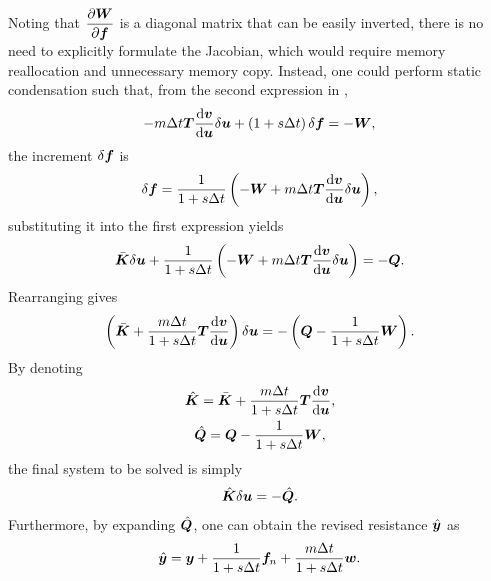Noting that $\dfrac{\partial{\bm{W}}}{\partial{\bm{f}}}$ is a diagonal matrix that can be easily inverted, there is no need to explicitly formulate the Jacobian, which would require memory reallocation and unnecessary memory copy. Instead, one could perform static condensation such that, from the second expression in ,
\begin{gather}
-m\Delta{}t\bm{T}\dfrac{\mathrm{d}\bm{v}}{\mathrm{d}\bm{u}}\delta\bm{u}+\left(1+s\Delta{}t\right)\delta\bm{f}=-\bm{W},
\end{gather}
the increment $\delta\bm{f}$ is
\begin{gather}\label{eq:incre_f}
\delta\bm{f}=\dfrac{1}{1+s\Delta{}t}\left(-\bm{W}+m\Delta{}t\bm{T}\dfrac{\mathrm{d}\bm{v}}{\mathrm{d}\bm{u}}\delta\bm{u}\right),
\end{gather}
substituting it into the first expression yields
\begin{gather}
\bar{\bm{K}}\delta\bm{u}+\dfrac{1}{1+s\Delta{}t}\left(-\bm{W}+m\Delta{}t\bm{T}\dfrac{\mathrm{d}\bm{v}}{\mathrm{d}\bm{u}}\delta\bm{u}\right)=-\bm{Q}.
\end{gather}
Rearranging gives
\begin{gather}
\left(\bar{\bm{K}}+\dfrac{m\Delta{}t}{1+s\Delta{}t}\bm{T}\dfrac{\mathrm{d}\bm{v}}{\mathrm{d}\bm{u}}\right)\delta\bm{u}=-\left(\bm{Q}-\dfrac{1}{1+s\Delta{}t}\bm{W}\right).
\end{gather}
By denoting
\begin{gather}\label{eq:revised_k}
\hat{\bm{K}}=\bar{\bm{K}}+\dfrac{m\Delta{}t}{1+s\Delta{}t}\bm{T}\dfrac{\mathrm{d}\bm{v}}{\mathrm{d}\bm{u}},\\
\hat{\bm{Q}}=\bm{Q}-\dfrac{1}{1+s\Delta{}t}\bm{W},
\end{gather}
the final system to be solved is simply
\begin{gather}\label{eq:revised_system}
\hat{\bm{K}}\delta\bm{u}=-\hat{\bm{Q}}.
\end{gather}
Furthermore, by expanding $\hat{\bm{Q}}$, one can obtain the revised resistance $\hat{\bm{y}}$ as
\begin{gather}\label{eq:revised_y}
\hat{\bm{y}}=\bm{y}+\dfrac{1}{1+s\Delta{}t}\bm{f}_n+\dfrac{m\Delta{}t}{1+s\Delta{}t}\bm{w}.
\end{gather}

